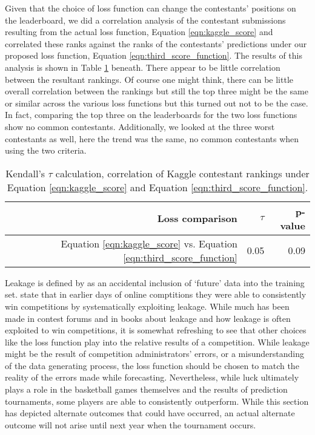 %

Given that the choice of loss function can change the contestants' positions on the leaderboard, we did a correlation analysis of the contestant submissions resulting from the actual loss function, Equation \ref{eqn:kaggle_score} and correlated these ranks against the ranks of the contestants'  predictions under our proposed loss function, Equation \ref{eqn:third_score_function}. The results of this analysis is shown in Table \ref{tab:kendall_tau_table} beneath. There appear to be little correlation between the resultant rankings. Of course one might think, there can be little overall correlation between the rankings but still the top three might be the same or similar across the various loss functions but this turned out not to be the case. In fact, comparing the top three on the leaderboards for the two loss functions show no common contestants. Additionally, we looked at the three worst contestants as well, here the trend was the same, no common contestants when using the two criteria. 

\begin{table}[ht]
\centering
\begin{tabular}{rrr}
  \hline
Loss comparison & $\tau$ & p-value \\ 
  \hline
Equation \ref{eqn:kaggle_score} vs. Equation \ref{eqn:third_score_function} & 0.05 & 0.09 \\ 
   \hline
\end{tabular}
\label{tab:kendall_tau_table}
\caption{Kendall's $\tau$ calculation, correlation of Kaggle contestant rankings under Equation  \ref{eqn:kaggle_score} and Equation \ref{eqn:third_score_function}.}
\end{table}



Leakage is defined by \cite{schutt2013doing} as an accidental inclusion of `future' data into the training set. \cite{schutt2013doing} state that in earlier days of online comptitions they were able to consistently win competitions by systematically exploiting leakage. While much has been made in contest forums and in books  about leakage and how leakage is often exploited to win competitions, it is somewhat refreshing to see that other choices like the loss function play into the relative results of a competition. While leakage might be the result of competition administrators' errors, or a misunderstanding of the data generating process, the loss function should be chosen to match the reality of the errors made while forecasting. Nevertheless, while luck ultimately plays a role in the basketball games themselves and the results of prediction tournaments, some players are able to consistently outperform. While this section has depicted alternate outcomes that could have occurred, an actual alternate outcome will not arise until next year when the tournament occurs.  
